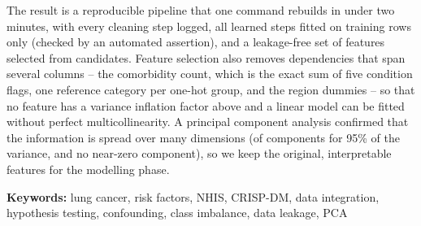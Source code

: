 The result is a reproducible pipeline that one command rebuilds in under two minutes, with every cleaning step logged, all learned steps fitted on training rows only (checked by an automated assertion), and a leakage-free set of \nFeatures features selected from \nCandidates candidates. Feature selection also removes dependencies that span several columns -- the comorbidity count, which is the exact sum of five condition flags, one reference category per one-hot group, and the region dummies -- so that no feature has a variance inflation factor above \maxVIFshort and a linear model can be fitted without perfect multicollinearity. A principal component analysis confirmed that the information is spread over many dimensions (\pcaNinetyFive of \nFeatures components for 95\% of the variance, and no near-zero component), so we keep the original, interpretable features for the modelling phase.

\medskip
\noindent\textbf{Keywords:} lung cancer, risk factors, NHIS, CRISP-DM, data integration, hypothesis testing, confounding, class imbalance, data leakage, PCA

\clearpage
